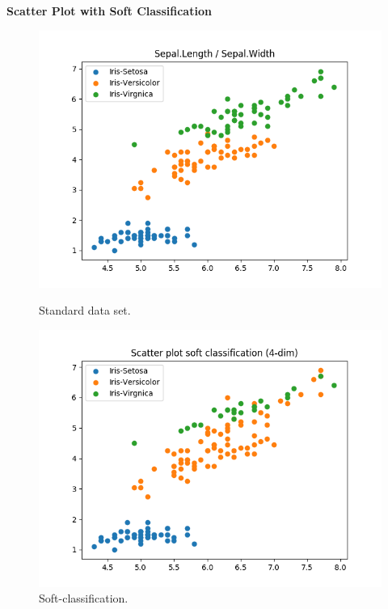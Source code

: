 \documentclass[a4paper]{article}
\begin{document}
\newpage
{\large \textbf{Scatter Plot with Soft Classification}} \\


\begin{figure}[htp]
\begin{minipage}{0.4\textwidth}
	\centering
  \includegraphics[scale=0.6]{plots/basic_scenario2_cmpnt3.png}
  \caption{Standard data set.}
\end{minipage}
\hfill
\begin{minipage}{0.4\textwidth}
	\centering
  \includegraphics[scale=0.6]{plots/soft_scatter_scenario2_cmpnt3.png}
  \caption{Soft-classification.}
\end{minipage}
\end{figure}
\end{document}
